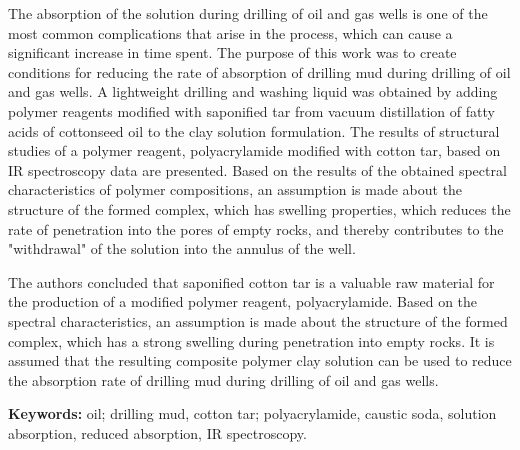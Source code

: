 The absorption of the solution during drilling of oil and gas wells is
one of the most common complications that arise in the process, which
can cause a significant increase in time spent. The purpose of this work
was to create conditions for reducing the rate of absorption of drilling
mud during drilling of oil and gas wells. A lightweight drilling and
washing liquid was obtained by adding polymer reagents modified with
saponified tar from vacuum distillation of fatty acids of cottonseed oil
to the clay solution formulation. The results of structural studies of a
polymer reagent, polyacrylamide modified with cotton tar, based on IR
spectroscopy data are presented. Based on the results of the obtained
spectral characteristics of polymer compositions, an assumption is made
about the structure of the formed complex, which has swelling
properties, which reduces the rate of penetration into the pores of
empty rocks, and thereby contributes to the "withdrawal" of the solution
into the annulus of the well.

The authors concluded that saponified cotton tar is a valuable raw
material for the production of a modified polymer reagent,
polyacrylamide. Based on the spectral characteristics, an assumption is
made about the structure of the formed complex, which has a strong
swelling during penetration into empty rocks. It is assumed that the
resulting composite polymer clay solution can be used to reduce the
absorption rate of drilling mud during drilling of oil and gas wells.

{\bfseries Keywords:} oil; drilling mud, cotton tar; polyacrylamide,
caustic soda, solution absorption, reduced absorption, IR spectroscopy.

